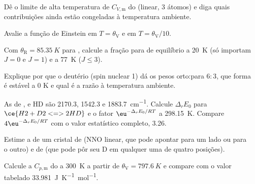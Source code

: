 \begin{exercise}[$\star$]\label{exo:b3:statistical-thermo-applied:1}
Dê o limite de alta temperatura de $C_{V,\mathrm m}$ do  (linear, 3 átomos) e diga
quais contribuições ainda estão congeladas à temperatura ambiente.
\end{exercise}

\begin{exercise}[$\star$]\label{exo:b3:statistical-thermo-applied:2}
Avalie a função de Einstein em $T = \theta_{\mathrm V}$ e em $T = \theta_{\mathrm V}/10$.
\end{exercise}

\begin{exercise}[$\star$]\label{exo:b3:statistical-thermo-applied:3}
Com $\theta_{\mathrm R} = \qty{85.35}{K}$ para , calcule a fração para de equilíbrio a
\qty{20}{K} (só importam $J = 0$ e $J = 1$) e a \qty{77}{K} ($J \le 3$).
\end{exercise}

\begin{exercise}[$\star$]\label{exo:b3:statistical-thermo-applied:4}
Explique por que o deutério (spin nuclear 1) dá os pesos orto:para $6 : 3$, que
forma é estável a 0 K e qual é a razão à temperatura ambiente.
\end{exercise}

\begin{exercise}[$\star\star$]\label{exo:b3:statistical-thermo-applied:5}
As  de ,  e HD são 2170.3, 1542.3 e
\qty{1883.7}{cm^{-1}}. Calcule $\Delta_rE_0$ para $\ce{H2 + D2 <=> 2 HD}$ e o fator $\eu^{-\Delta_rE_0/RT}$ a
\qty{298.15}{K}. Compare $4\eu^{-\Delta_rE_0/RT}$ com o valor estatístico completo, 3.26.
\end{exercise}

\begin{exercise}[$\star\star$]\label{exo:b3:statistical-thermo-applied:6}
Estime a  de um cristal de  (NNO linear, que pode
apontar para um lado ou para o outro) e de  (que pode pôr seu D em
qualquer uma de quatro posições).
\end{exercise}

\begin{exercise}[$\star\star$]\label{exo:b3:statistical-thermo-applied:7}
Calcule a $C_{p,\mathrm m}$ do  a \qty{300}{K} a partir de $\theta_{\mathrm V} = \qty{797.6}{K}$ e compare com o
valor tabelado \qty{33.981}{J.K^{-1}.mol^{-1}}.
\end{exercise}

